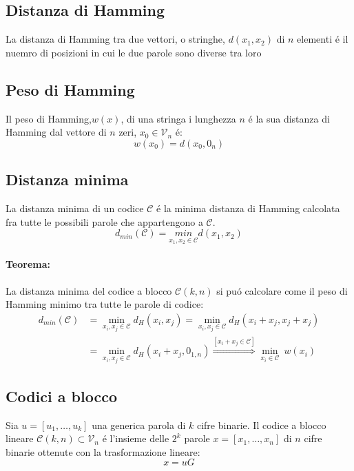    \subsection{Distanza di Hamming}
        La distanza di Hamming tra due vettori, o stringhe, $d(x_1,x_2)$ di $n$ elementi é il nuemro di posizioni in cui le due parole
        sono diverse tra loro
    \subsection{Peso di Hamming}
        Il peso di Hamming,$w(x)$, di una stringa i lunghezza $n$ é la sua distanza di Hamming dal vettore di $n$ zeri,
        $x_0\in \mathcal{V}_n$ é:
        \[
            w(x_0) = d(x_0,0_n)
        \]
    \subsection{Distanza minima}    
        La distanza minima di un codice $\mathcal{C}$ é la minima distanza di Hamming calcolata fra tutte le possibili parole che appartengono a $\mathcal{C}$.
        \[
            d_{min} (\mathcal{C})= \underset{x_1,x_2 \in \mathcal{C}}{min}d(x_1,x_2)  
        \]
        \paragraph{Teorema:} La distanza minima del codice a blocco $\mathcal{C}(k,n)$ si puó calcolare come il 
            peso di Hamming minimo tra tutte le parole di codice:
            \begin{align}
                d_{min}(\mathcal{C}) &= \underset{x_i,x_j\in\mathcal{C}}{\min} d_H(x_i,x_j) = \underset{x_i,x_j\in\mathcal{C}}{\min} d_H(x_i+x_j,x_j+x_j)\nonumber \\
                                        &= \underset{x_i,x_j\in\mathcal{C}}{\min} d_H(x_i+x_j,0_{1,n}) \overset{[x_i+x_j\in\mathcal{C}]}{\Rightarrow} \underset{x_i\in\mathcal{C}}{\min}\ w(x_i)\nonumber
            \end{align}
    \subsection{Codici a blocco}
        Sia $u = [u_1, \dots, u_k]$ una generica parola di $k$ cifre binarie. Il codice a blocco lineare $\mathcal{C}(k,n)\subset \mathcal{V}_n$ é l'insieme delle
        $2^k$ parole $x = [x_1, \dots, x_n]$ di $n$ cifre binarie ottenute con la trasformazione lineare:
        \[
            x = uG  
        \]
